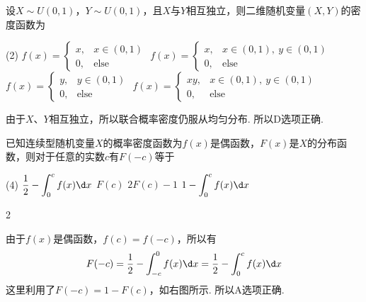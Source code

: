 \begin{problem}
    设$X\sim U(0,1)$，$Y\sim U(0,1)$，且$X$与$Y$相互独立，则二维随机变量$(X,Y)$的密度函数为
    \begin{tasks}(2)
        \task $f(x)=
            \begin{cases}
                x, & x\in(0,1)\\
                0, & \text{else}
            \end{cases}$
        \task $f(x)=
            \begin{cases}
                x, & x\in(0,1),\ y\in(0,1)\\
                0, & \text{else}
            \end{cases}$
        \task $f(x)=
            \begin{cases}
                y, & y\in(0,1)\\
                0, & \text{else}
            \end{cases}$
        \task[\true] $f(x)=
            \begin{cases}
                xy, & x\in(0,1),\ y\in(0,1)\\
                0, & \text{else}
            \end{cases}$
    \end{tasks}
\end{problem}
\begin{solution}
    由于$X$、$Y$相互独立，所以联合概率密度仍服从均匀分布. 所以D选项正确.
\end{solution}

\begin{problem}
    已知连续型随机变量$X$的概率密度函数为$f(x)$是偶函数，$F(x)$是$X$的分布函数，则对于任意的实数$c$有$F(-c)$等于
    \begin{tasks}(4)
        \task[\true] $\displaystyle\frac12-\int_0^cf(x)\d x$
        \task $F(c)$
        \task $2F(c)-1$
        \task $\displaystyle1-\int_0^cf(x)\d x$
    \end{tasks}
\end{problem}
\begin{paracol}{2}
\begin{solution}
    由于$f(x)$是偶函数，$f(c)=f(-c)$，所以有
    \[F(-c)=\frac12-\int_{-c}^0f(x)\d x=\frac12-\int_0^cf(x)\d x\]
    这里利用了$F(-c)=1-F(c)$，如右图所示. 所以A选项正确.
\switchcolumn
\vspace*{\fill}
\centering
{}
\vspace{\fill}
\end{solution}
\end{paracol}

